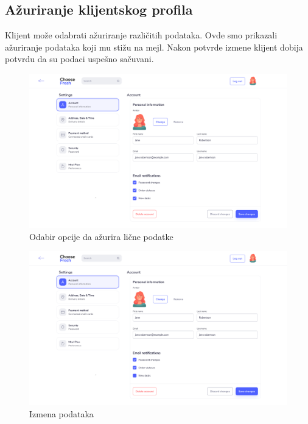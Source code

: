 \subsection{Ažuriranje klijentskog profila}

Klijent može odabrati ažuriranje različitih podataka. Ovde smo prikazali ažuriranje podataka koji mu stižu na mejl. Nakon potvrde izmene klijent dobija potvrdu da su podaci uspešno sačuvani.

\begin{figure}[H]
	\begin{center}
		\includegraphics[width=\textwidth]{UI/account_settings.png}
    		\caption{Odabir opcije da ažurira lične podatke}
    \label{fig:AccountSettings}
    \end{center}
\end{figure}

\begin{figure}[H]
	\begin{center}
		\includegraphics[width=\textwidth]{UI/account_settings_update.png}
    		\caption{Izmena podataka}
    \label{fig:AccountSettingsUpdate}
    \end{center}
\end{figure}

